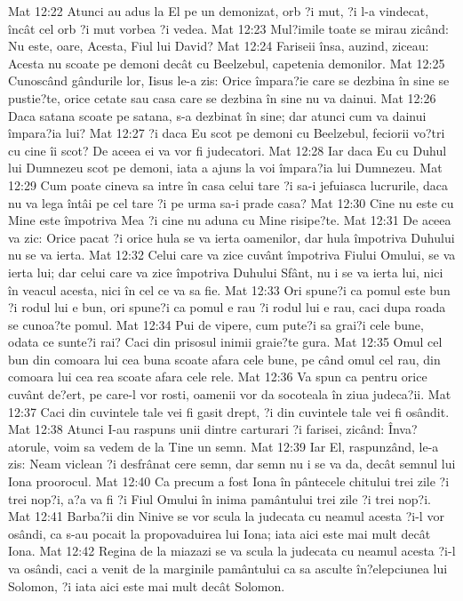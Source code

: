 Mat 12:22  Atunci au adus la El pe un demonizat, orb ?i mut, ?i l-a vindecat, încât cel orb ?i mut vorbea ?i vedea.
Mat 12:23  Mul?imile toate se mirau zicând: Nu este, oare, Acesta, Fiul lui David?
Mat 12:24  Fariseii însa, auzind, ziceau: Acesta nu scoate pe demoni decât cu Beelzebul, capetenia demonilor.
Mat 12:25  Cunoscând gândurile lor, Iisus le-a zis: Orice împara?ie care se dezbina în sine se pustie?te, orice cetate sau casa care se dezbina în sine nu va dainui.
Mat 12:26  Daca satana scoate pe satana, s-a dezbinat în sine; dar atunci cum va dainui împara?ia lui?
Mat 12:27  ?i daca Eu scot pe demoni cu Beelzebul, feciorii vo?tri cu cine îi scot? De aceea ei va vor fi judecatori.
Mat 12:28  Iar daca Eu cu Duhul lui Dumnezeu scot pe demoni, iata a ajuns la voi împara?ia lui Dumnezeu.
Mat 12:29  Cum poate cineva sa intre în casa celui tare ?i sa-i jefuiasca lucrurile, daca nu va lega întâi pe cel tare ?i pe urma sa-i prade casa?
Mat 12:30  Cine nu este cu Mine este împotriva Mea ?i cine nu aduna cu Mine risipe?te.
Mat 12:31  De aceea va zic: Orice pacat ?i orice hula se va ierta oamenilor, dar hula împotriva Duhului nu se va ierta.
Mat 12:32  Celui care va zice cuvânt împotriva Fiului Omului, se va ierta lui; dar celui care va zice împotriva Duhului Sfânt, nu i se va ierta lui, nici în veacul acesta, nici în cel ce va sa fie.
Mat 12:33  Ori spune?i ca pomul este bun ?i rodul lui e bun, ori spune?i ca pomul e rau ?i rodul lui e rau, caci dupa roada se cunoa?te pomul.
Mat 12:34  Pui de vipere, cum pute?i sa grai?i cele bune, odata ce sunte?i rai? Caci din prisosul inimii graie?te gura.
Mat 12:35  Omul cel bun din comoara lui cea buna scoate afara cele bune, pe când omul cel rau, din comoara lui cea rea scoate afara cele rele.
Mat 12:36  Va spun ca pentru orice cuvânt de?ert, pe care-l vor rosti, oamenii vor da socoteala în ziua judeca?ii.
Mat 12:37  Caci din cuvintele tale vei fi gasit drept, ?i din cuvintele tale vei fi osândit.
Mat 12:38  Atunci I-au raspuns unii dintre carturari ?i farisei, zicând: Înva?atorule, voim sa vedem de la Tine un semn.
Mat 12:39  Iar El, raspunzând, le-a zis: Neam viclean ?i desfrânat cere semn, dar semn nu i se va da, decât semnul lui Iona proorocul.
Mat 12:40  Ca precum a fost Iona în pântecele chitului trei zile ?i trei nop?i, a?a va fi ?i Fiul Omului în inima pamântului trei zile ?i trei nop?i.
Mat 12:41  Barba?ii din Ninive se vor scula la judecata cu neamul acesta ?i-l vor osândi, ca s-au pocait la propovaduirea lui Iona; iata aici este mai mult decât Iona.
Mat 12:42  Regina de la miazazi se va scula la judecata cu neamul acesta ?i-l va osândi, caci a venit de la marginile pamântului ca sa asculte în?elepciunea lui Solomon, ?i iata aici este mai mult decât Solomon.
